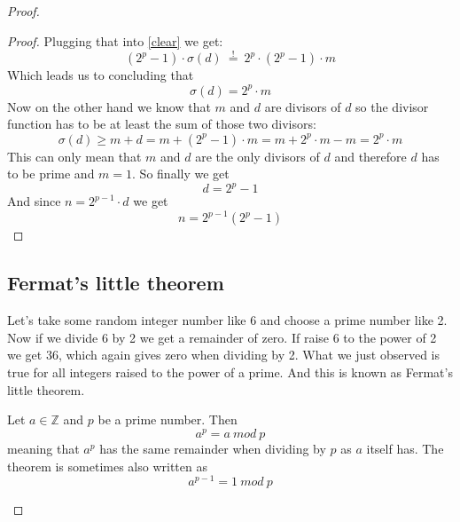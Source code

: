\documentclass{article}
\theoremstyle{definition}
\begin{document}
\begin{proof}
\begin{proof}
Plugging that into \ref{clear} we get:
\begin{equation}
       (2^p-1)
          \cdot \sigma(d) \: \overset{!}{=} \:  2^p \cdot  (2^p-1) \cdot m
\end{equation}
Which leads us to concluding that
\begin{equation}
    \sigma(d) = 2^p\cdot m
\end{equation}
Now on the other hand we know that $m$ and $d$ are divisors of $d$ so the divisor function has to be at least the sum of those two divisors:
\begin{equation}
    \sigma(d) \geq m + d = m + (2^p-1)\cdot m = m + 2^p\cdot m - m = 2^p \cdot m
\end{equation}
This can only mean that $m$ and $d$ are the only divisors of $d$ and therefore $d$ has to be prime and $m=1$. So finally we get 
\begin{equation}
    d = 2^p-1
\end{equation}
And since $n = 2^{p-1}\cdot d$ we get
\begin{equation}
    n = 2^{p-1}(2^p-1)
\end{equation}
\end{proof}















\subsection{Fermat's little theorem}
Let's take some random integer number like 6 and choose a prime number like 2. Now if we divide 6 by 2 we get a remainder of zero. If raise 6 to the power of 2 we get 36, which again gives zero when dividing by 2. What we just observed is true for all integers raised to the power of a prime. And this is known as Fermat's little theorem.

\begin{theorem}
    Let $a \in \mathbb{Z}$ and $p$ be a prime number. Then 
    \begin{equation}
        a^p = a \: mod \: p
    \end{equation}
    meaning that $a^p$ has the same remainder when dividing by $p$ as $a$ itself has. The theorem is sometimes also written as 
    \begin{equation}
        a^{p-1} = 1 \: mod \: p
    \end{equation}
\end{theorem}


\end{proof}
\end{document}
